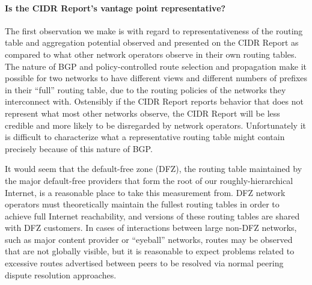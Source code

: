 \paragraph{Is the CIDR Report's vantage point representative?}
The first observation we make is with regard to representativeness of the
routing table and aggregation potential observed and presented on the CIDR
Report as compared to what other network operators observe in their own routing
tables. The nature of BGP and policy-controlled route selection and propagation
make it possible for two networks to have different views and different numbers
of prefixes in their ``full'' routing table, due to the routing policies of the
networks they interconnect with. Ostensibly if the CIDR Report reports behavior
that does not represent what most other networks observe, the CIDR Report will
be less credible and more likely to be disregarded by network operators.
Unfortunately it is difficult to characterize what a representative routing
table might contain precisely because of this nature of BGP.

It would seem that the default-free zone (DFZ), the routing table maintained by
the major default-free providers that form the root of our roughly-hierarchical
Internet, is a reasonable place to take this measurement from. DFZ network
operators must theoretically maintain the fullest routing tables in order to
achieve full Internet reachability, and versions of these routing tables are
shared with DFZ customers. In cases of interactions between large
non-DFZ networks, such as major content provider or ``eyeball'' networks,
routes may be observed that are not globally visible, but it is reasonable to
expect problems related to excessive routes advertised between peers to be
resolved via normal peering dispute resolution approaches.

